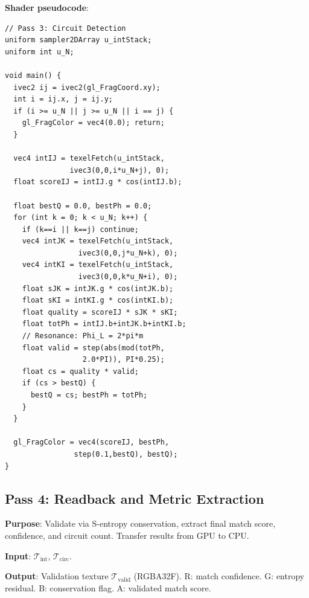 \documentclass[11pt,twocolumn,a4paper]{article}
\begin{document}
\textbf{Shader pseudocode}:
\begin{lstlisting}[style=glsl]
// Pass 3: Circuit Detection
uniform sampler2DArray u_intStack;
uniform int u_N;

void main() {
  ivec2 ij = ivec2(gl_FragCoord.xy);
  int i = ij.x, j = ij.y;
  if (i >= u_N || j >= u_N || i == j) {
    gl_FragColor = vec4(0.0); return;
  }

  vec4 intIJ = texelFetch(u_intStack,
               ivec3(0,0,i*u_N+j), 0);
  float scoreIJ = intIJ.g * cos(intIJ.b);

  float bestQ = 0.0, bestPh = 0.0;
  for (int k = 0; k < u_N; k++) {
    if (k==i || k==j) continue;
    vec4 intJK = texelFetch(u_intStack,
                 ivec3(0,0,j*u_N+k), 0);
    vec4 intKI = texelFetch(u_intStack,
                 ivec3(0,0,k*u_N+i), 0);
    float sJK = intJK.g * cos(intJK.b);
    float sKI = intKI.g * cos(intKI.b);
    float quality = scoreIJ * sJK * sKI;
    float totPh = intIJ.b+intJK.b+intKI.b;
    // Resonance: Phi_L = 2*pi*m
    float valid = step(abs(mod(totPh,
                  2.0*PI)), PI*0.25);
    float cs = quality * valid;
    if (cs > bestQ) {
      bestQ = cs; bestPh = totPh;
    }
  }

  gl_FragColor = vec4(scoreIJ, bestPh,
                step(0.1,bestQ), bestQ);
}
\end{lstlisting}

\subsection{Pass 4: Readback and Metric Extraction}
\label{subsec:pass4}

\textbf{Purpose}: Validate via S-entropy conservation, extract final
match score, confidence, and circuit count. Transfer results from GPU
to CPU.

\textbf{Input}: $\mathcal{T}_{\text{int}}$, $\mathcal{T}_{\text{circ}}$.

\textbf{Output}: Validation texture $\mathcal{T}_{\text{valid}}$
(RGBA32F). R: match confidence. G: entropy residual. B: conservation
flag. A: validated match score.
\end{document}
